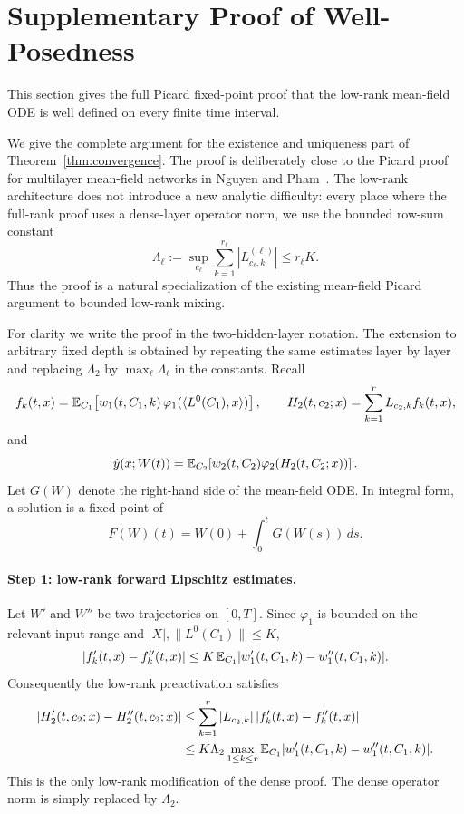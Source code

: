 \section{Supplementary Proof of Well-Posedness}
\label{app:wellposed-proof}

This section gives the full Picard fixed-point proof that the low-rank mean-field ODE is well defined on every finite time interval.

We give the complete argument for the existence and uniqueness part of Theorem~\ref{thm:convergence}. The proof is deliberately close to the Picard proof for multilayer mean-field networks in Nguyen and Pham~\cite{nguyen2023}. The low-rank architecture does not introduce a new analytic difficulty: every place where the full-rank proof uses a dense-layer operator norm, we use the bounded row-sum constant
\begin{equation}
\Lambda_\ell
:=
\sup_{c_\ell}\sum_{k=1}^{r_\ell}|L^{(\ell)}_{c_\ell,k}|
\le r_\ell K .
\label{eq:lr-mixing-constant}
\end{equation}
Thus the proof is a natural specialization of the existing mean-field Picard argument to bounded low-rank mixing.

For clarity we write the proof in the two-hidden-layer notation. The extension to arbitrary fixed depth is obtained by repeating the same estimates layer by layer and replacing $\Lambda_2$ by $\max_\ell \Lambda_\ell$ in the constants. Recall
\begin{equation}
f_k(t,x)=
\mathbb{E}_{C_1}\!\left[
w_1(t,C_1,k)\,
\varphi_1(\langle L^0(C_1),x\rangle)
\right],
\qquad
H_2(t,c_2;x)=\sum_{k=1}^r L_{c_2,k}f_k(t,x),
\end{equation}
and
\begin{equation}
\hat y(x;W(t))
=
\mathbb{E}_{C_2}\!\left[
w_2(t,C_2)\varphi_2(H_2(t,C_2;x))
\right].
\end{equation}
Let $G(W)$ denote the right-hand side of the mean-field ODE. In integral form, a solution is a fixed point of
\begin{equation}
F(W)(t)=W(0)+\int_0^t G(W(s))\,ds .
\label{eq:picard-map}
\end{equation}

\paragraph{Step 1: low-rank forward Lipschitz estimates.}
Let $W'$ and $W''$ be two trajectories on $[0,T]$. Since $\varphi_1$ is bounded on the relevant input range and $|X|,\|L^0(C_1)\|\le K$,
\begin{equation}
|f'_k(t,x)-f''_k(t,x)|
\le
K\,\mathbb{E}_{C_1}|w'_1(t,C_1,k)-w''_1(t,C_1,k)|.
\end{equation}
Consequently the low-rank preactivation satisfies
\begin{align}
|H'_2(t,c_2;x)-H''_2(t,c_2;x)|
&\le
\sum_{k=1}^r |L_{c_2,k}|\,
|f'_k(t,x)-f''_k(t,x)|
\nonumber\\
&\le
K\Lambda_2
\max_{1\le k\le r}
\mathbb{E}_{C_1}|w'_1(t,C_1,k)-w''_1(t,C_1,k)|.
\label{eq:H-lr-lipschitz}
\end{align}
This is the only low-rank modification of the dense proof. The dense operator norm is simply replaced by $\Lambda_2$.

